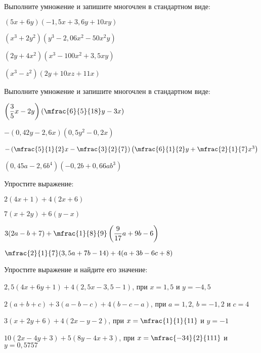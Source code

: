 \begin{class}[number=6]
	\begin{listofex}
		\item Выполните умножение и запишите многочлен в стандартном виде:
		\begin{enumcols}[itemcolumns=2]
			\item \( (5x+6y)(-1,5x+3,6y+10xy) \)
			\item \( (x^3+2y^2)(y^3-2,06x^2-50x^2y) \)
			\item \( (2y+4x^2)(x^3-100x^2+3,5xy) \)
			\item \( (x^3-z^2)(2y+10xz+11x) \)
		\end{enumcols}
		\item Выполните умножение и запишите многочлен в стандартном виде:
		\begin{enumcols}[itemcolumns=2]
			\item \( \left( \dfrac{3}{5}x-2y \right)\left( \mfrac{6}{5}{18}y-3x \right) \)
			\item \( -(0,42y-2,6x)(0,5y^2-0,2x) \)
			\item \( -\left( \mfrac{5}{1}{2}x-\mfrac{3}{2}{7} \right)\left( \mfrac{6}{1}{2}y+\mfrac{2}{1}{7}x^3 \right) \)
			\item \( (0,45a-2,6b^4)(-0,2b+0,66ab^3) \)
		\end{enumcols}
		\item Упростите выражение:
		\begin{enumcols}[itemcolumns=2]
			\item \( 2(4x+1)+4(2x+6) \)
			\item \( 7(x+2y)+6(y-x) \)
			\item \( 3(2a-b+7)+\mfrac{1}{8}{9}\left( \dfrac{9}{17}a+9b-6 \right) \)
			\item \( \mfrac{2}{1}{7}(3,5a+7b-14)+4(a+3b-6c+8) \)
		\end{enumcols}
		\item Упростите выражение и найдите его значение:
		\begin{enumcols}
			\item \( 2,5(4x+6y+1)+4(2,5x-3,5-1) \), при \( x=1,5 \) и \( y=-4,5 \)
			\item \( 2(a+b+c)+3(a-b-c)+4(b-c-a) \), при \( a=1,2 \), \( b=-1,2 \) и \( c=4 \)
			\item \( 3(x+2y+6)+4(2x-y-2) \), при \( x=\mfrac{1}{1}{11} \) и \( y=-1 \)
			\item \( 10(2x-4y+3)+5(8y-4x+3) \), при \( x=\mfrac{-34}{2}{111} \) и \( y=0,5757 \)
		\end{enumcols}

\end{listofex}
\end{class}
